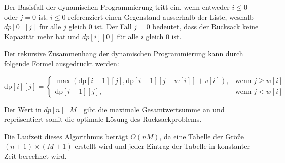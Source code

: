 Der Basisfall der dynamischen Programmierung tritt ein, wenn 
entweder $i \le 0$ oder $j = 0$ ist. $i \le 0$ referenziert einen 
Gegenstand ausserhalb der Liste, weshalb $dp[0][j]$ für alle $j$ gleich $0$ ist. 
Der Fall $j = 0$ bedeutet, 
dass der Rucksack keine Kapazität mehr hat und $dp[i][0]$ 
für alle $i$ gleich $0$ ist.

Der rekursive Zusammenhang der dynamischen Programmierung 
kann durch folgende Formel ausgedrückt werden:

\begin{equation}
    \text{dp}[i][j] = \begin{cases}
        \max(\text{dp}[i-1][j], \text{dp}[i-1][j-w[i]] + v[i]), & \text{wenn } j \geq w[i] \\
        \text{dp}[i-1][j], & \text{wenn } j < w[i]
    \end{cases}
\end{equation}


Der Wert in $dp[n][M]$ gibt die maximale Gesamtwertsumme an und 
repräsentiert somit die optimale Lösung des Rucksackproblems.

Die Laufzeit dieses Algorithmus beträgt $O(nM)$, da 
eine Tabelle der Größe $(n+1) × (M+1)$ erstellt wird und 
jeder Eintrag der Tabelle in konstanter Zeit berechnet wird.\ \cite[vgl.]{Martello1987}